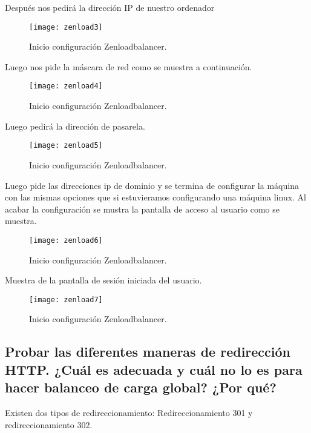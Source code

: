 Después nos pedirá la dirección IP de nuestro ordenador 

\begin{figure}[H]
		\centering
		\texttt{[image: zenload3]}
		\caption{Inicio configuración Zenloadbalancer.}
		\label{figura 3}
\end{figure}

Luego nos pide la máscara de red  como se muestra a continuación.

\begin{figure}[H]
		\centering
		\texttt{[image: zenload4]}
		\caption{Inicio configuración Zenloadbalancer.}
		\label{figura 4}
\end{figure}

Luego pedirá la dirección de pasarela.

\begin{figure}[H]
		\centering
		\texttt{[image: zenload5]}
		\caption{Inicio configuración Zenloadbalancer.}
		\label{figura 5}
\end{figure}

Luego pide las direcciones ip de dominio y se termina de configurar la máquina con las mismas opciones que si estuvieramos configurando una máquina linux. Al acabar la configuración se mustra la pantalla de acceso al usuario como se muestra.\\

\begin{figure}[H]
		\centering
		\texttt{[image: zenload6]}
		\caption{Inicio configuración Zenloadbalancer.}
		\label{figura 6}
\end{figure}

Muestra de la pantalla de sesión iniciada del usuario.\\

\begin{figure}[H]
		\centering
		\texttt{[image: zenload7]}
		\caption{Inicio configuración Zenloadbalancer.}
		\label{figura 7}
\end{figure}

\subsection{ Probar las diferentes maneras de redirección HTTP. ¿Cuál es adecuada y cuál no lo es para hacer balanceo de carga global? ¿Por qué?  }

Existen dos tipos de redireccionamiento: Redireccionamiento 301 y redireccionamiento 302.\\

